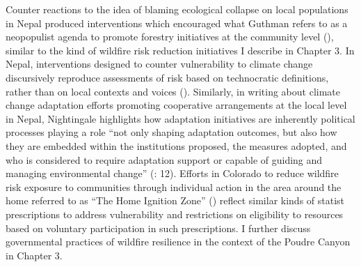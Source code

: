\documentclass[
]{article}
\begin{document}
Counter reactions to the idea of blaming ecological collapse on local populations in Nepal produced interventions which encouraged what Guthman refers to as a neopopulist agenda to promote forestry initiatives at the community level (), similar to the kind of wildfire risk reduction initiatives I describe in Chapter 3. In Nepal, interventions designed to counter vulnerability to climate change discursively reproduce assessments of risk based on technocratic definitions, rather than on local contexts and voices (). Similarly, in writing about climate change adaptation efforts promoting cooperative arrangements at the local level in Nepal, Nightingale highlights how adaptation initiatives are inherently political processes playing a role ``not only shaping adaptation outcomes, but also how they are embedded within the institutions proposed, the measures adopted, and who is considered to require adaptation support or capable of guiding and managing environmental change'' (: 12). Efforts in Colorado to reduce wildfire risk exposure to communities through individual action in the area around the home referred to as ``The Home Ignition Zone'' () reflect similar kinds of statist prescriptions to address vulnerability and restrictions on eligibility to resources based on voluntary participation in such prescriptions. I further discuss governmental practices of wildfire resilience in the context of the Poudre Canyon in Chapter 3.
\end{document}
